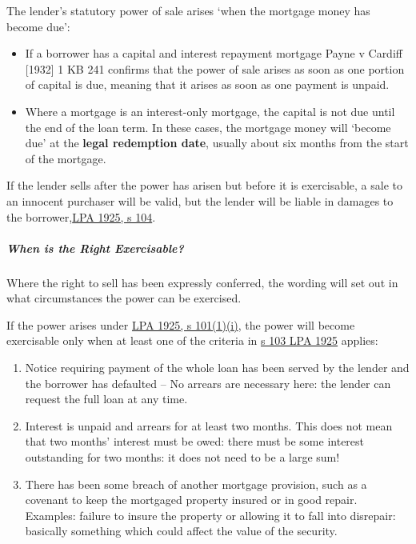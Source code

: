 \documentclass[
]{article}
\providecommand{\tightlist}{%
  \setlength{\itemsep}{0pt}\setlength{\parskip}{0pt}}
\begin{document}
The lender's statutory power of sale arises `when the mortgage money has
become due':

\begin{itemize}
\tightlist
\item
  If a borrower has a capital and interest repayment mortgage Payne v
  Cardiff {[}1932{]} 1 KB 241 confirms that the power of sale arises as
  soon as one portion of capital is due, meaning that it arises as soon
  as one payment is unpaid.
\item
  Where a mortgage is an interest-only mortgage, the capital is not due
  until the end of the loan term. In these cases, the mortgage money
  will `become due' at the \textbf{legal redemption date}, usually about
  six months from the start of the mortgage.
\end{itemize}

If the lender sells after the power has arisen but before it is
exercisable, a sale to an innocent purchaser will be valid, but the
lender will be liable in damages to the
borrower,\href{https://www.legislation.gov.uk/ukpga/Geo5/15-16/20/section/104}{LPA
1925, s 104}.

\hypertarget{when-is-the-right-exercisable}{%
\subparagraph{When is the Right
Exercisable?}\label{when-is-the-right-exercisable}}

Where the right to sell has been expressly conferred, the wording will
set out in what circumstances the power can be exercised.

If the power arises under
\href{https://www.legislation.gov.uk/ukpga/Geo5/15-16/20/section/101}{LPA
1925, s 101(1)(i)}, the power will become exercisable only when at least
one of the criteria in
\href{https://www.legislation.gov.uk/ukpga/Geo5/15-16/20/section/103}{s
103 LPA 1925} applies:

\begin{enumerate}
\tightlist
\item
  Notice requiring payment of the whole loan has been served by the
  lender and the borrower has defaulted -- No arrears are necessary
  here: the lender can request the full loan at any time.
\item
  Interest is unpaid and arrears for at least two months. This does not
  mean that two months' interest must be owed: there must be some
  interest outstanding for two months: it does not need to be a large
  sum!
\item
  There has been some breach of another mortgage provision, such as a
  covenant to keep the mortgaged property insured or in good repair.
  Examples: failure to insure the property or allowing it to fall into
  disrepair: basically something which could affect the value of the
  security.
\end{enumerate}
\end{document}
